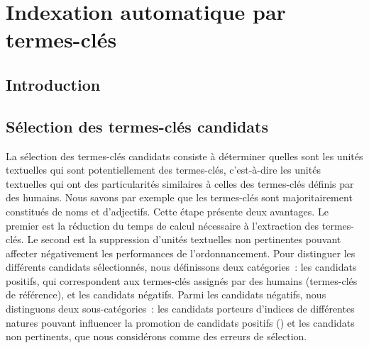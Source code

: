 \chapter{Indexation automatique par termes-clés}
\label{part:main-state_of_the_art}
  \section{Introduction}
  \label{sec:main-state_of_the_art-introduction}


  \section{Sélection des termes-clés candidats}
  \label{sec:main-state_of_the_art-keyphrase_candidate_selection}
    La sélection des termes-clés candidats consiste à déterminer
    quelles sont les unités textuelles qui sont potentiellement des termes-clés,
    c'est-à-dire les unités textuelles qui ont des particularités similaires à
    celles des termes-clés définis par des humains. Nous savons par exemple que
    les termes-clés sont majoritairement constitués de noms et d'adjectifs.
    Cette étape présente deux avantages. Le premier est la réduction du temps de
    calcul nécessaire à l'extraction des  termes-clés. Le second est la
    suppression d'unités textuelles non pertinentes pouvant affecter
    négativement les performances de l'ordonnancement. Pour distinguer les
    différents candidats sélectionnés, nous définissons deux catégories~: les
    candidats positifs, qui correspondent aux termes-clés assignés par des
    humains (termes-clés de référence), et les candidats négatifs. Parmi les
    candidats négatifs, nous distinguons deux sous-catégories~: les candidats
    porteurs d'indices de différentes natures pouvant
    influencer la promotion de candidats positifs () et les
    candidats non pertinents, que nous considérons comme des
    erreurs de sélection.

